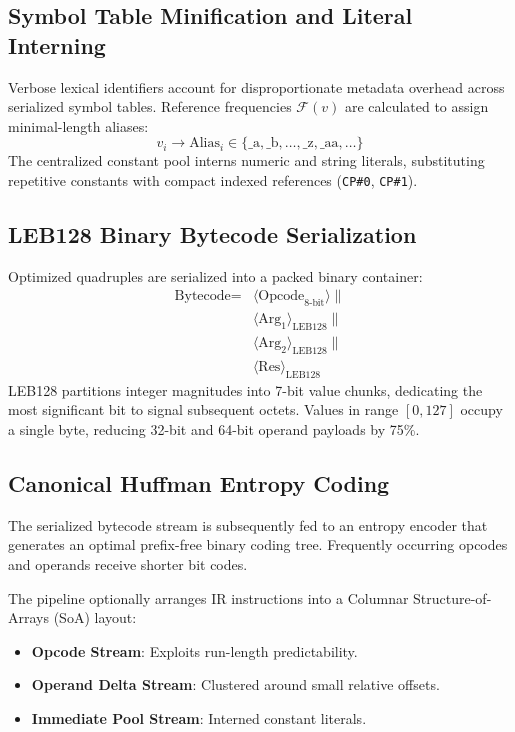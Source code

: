 \documentclass{ieeeaccess}
\begin{document}
\subsection{Symbol Table Minification and Literal Interning}
Verbose lexical identifiers account for disproportionate metadata overhead across serialized symbol tables. Reference frequencies $\mathcal{F}(v)$ are calculated to assign minimal-length aliases:
\begin{equation}
v_i \longrightarrow \text{Alias}_i \in \{\text{\_a}, \text{\_b}, \dots, \text{\_z}, \text{\_aa}, \dots\}
\end{equation}
The centralized constant pool interns numeric and string literals, substituting repetitive constants with compact indexed references (\texttt{CP\#0}, \texttt{CP\#1}).

\subsection{LEB128 Binary Bytecode Serialization}
Optimized quadruples are serialized into a packed binary container:
\begin{equation}
\begin{aligned}
\text{Bytecode} ={}& \langle \text{Opcode}_{8\text{-bit}} \rangle \parallel \\
& \langle \text{Arg}_1 \rangle_{\text{LEB128}} \parallel \\
& \langle \text{Arg}_2 \rangle_{\text{LEB128}} \parallel \\
& \langle \text{Res} \rangle_{\text{LEB128}}
\end{aligned}
\end{equation}
LEB128 partitions integer magnitudes into 7-bit value chunks, dedicating the most significant bit to signal subsequent octets. Values in range $[0, 127]$ occupy a single byte, reducing 32-bit and 64-bit operand payloads by 75\%.

\subsection{Canonical Huffman Entropy Coding}
The serialized bytecode stream is subsequently fed to an entropy encoder that generates an optimal prefix-free binary coding tree. Frequently occurring opcodes and operands receive shorter bit codes.

The pipeline optionally arranges IR instructions into a Columnar Structure-of-Arrays (SoA) layout:
\begin{itemize}
    \item \textbf{Opcode Stream}: Exploits run-length predictability.
    \item \textbf{Operand Delta Stream}: Clustered around small relative offsets.
    \item \textbf{Immediate Pool Stream}: Interned constant literals.
\end{itemize}
\end{document}
